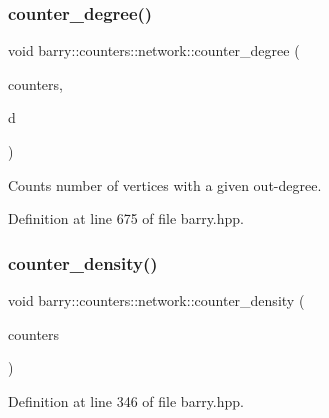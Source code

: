 \subsubsection{\texorpdfstring{counter\+\_\+degree()}{counter\_degree()}}
{\footnotesize\ttfamily void barry\+::counters\+::network\+::counter\+\_\+degree (\begin{DoxyParamCaption}\item[{\hyperlink{namespacebarry_1_1counters_1_1network_aa72fdb34752ac24167a06ee196a8fff6}{Net\+Counters} $\ast$}]{counters,  }\item[{std\+::vector$<$ \hyperlink{namespacebarry_a11dfc53ddb4672278319aa04f1e09a6c}{uint} $>$}]{d }\end{DoxyParamCaption})\hspace{0.3cm}{\ttfamily [inline]}}



Counts number of vertices with a given out-\/degree. 



Definition at line 675 of file barry.\+hpp.

\mbox{\label{namespacebarry_1_1counters_1_1network_a91e3daed40ea0514e0ede00ab303a738}} 
\subsubsection{\texorpdfstring{counter\+\_\+density()}{counter\_density()}}
{\footnotesize\ttfamily void barry\+::counters\+::network\+::counter\+\_\+density (\begin{DoxyParamCaption}\item[{\hyperlink{namespacebarry_1_1counters_1_1network_aa72fdb34752ac24167a06ee196a8fff6}{Net\+Counters} $\ast$}]{counters }\end{DoxyParamCaption})\hspace{0.3cm}{\ttfamily [inline]}}



Definition at line 346 of file barry.\+hpp.

\mbox{\label{namespacebarry_1_1counters_1_1network_a2050eea4ac26f5e10483622633081962}} 
